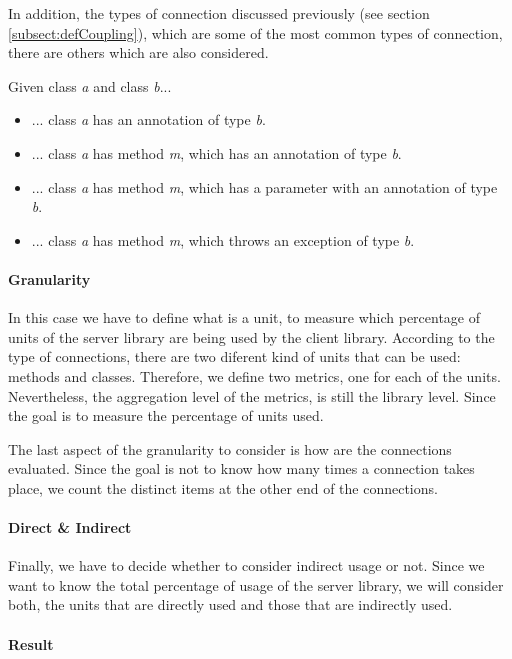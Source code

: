 In addition, the types of connection discussed previously (see section \ref{subsect:defCoupling}), which are some of the most common types of connection, there are others which are also considered.

Given class \textit{a} and class \textit{b}...

\begin{itemize}
  \item ... class \textit{a} has an annotation of type \textit{b}.
  \item ... class \textit{a} has method \textit{m}, which has an annotation of type \textit{b}.
  \item ... class \textit{a} has method \textit{m}, which has a parameter with an annotation of type \textit{b}.
  \item ... class \textit{a} has method \textit{m}, which throws an exception of type \textit{b}.
\end{itemize}

\paragraph{Granularity}
In this case we have to define what is a unit, to measure which percentage of units of the server library are being used by the client library. According to the type of connections, there are two diferent kind of units that can be used: methods and classes. Therefore, we define two metrics, one for each of the units. Nevertheless, the aggregation level of the metrics, is still the library level. Since the goal is to measure the percentage of units used.

The last aspect of the granularity to consider is how are the connections evaluated. Since the goal is not to know how many times a connection takes place, we count the distinct items at the other end of the connections.

\paragraph{Direct \& Indirect}
Finally, we have to decide whether to consider indirect usage or not. Since we want to know the total percentage of usage of the server library, we will consider both, the units that are directly used and those that are indirectly used.


\paragraph{Result}

